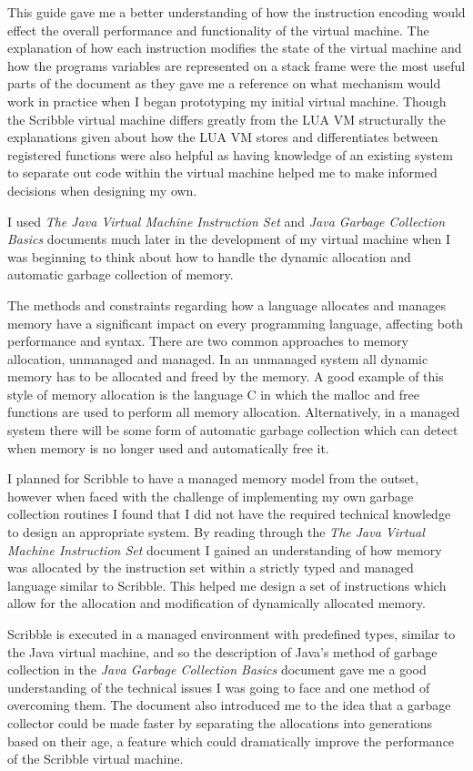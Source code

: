 \documentclass[]{final_report}
\begin{document}
This guide gave me a better understanding of how the instruction encoding would effect the overall performance and functionality of the virtual machine. The explanation of how each instruction modifies the state of the virtual machine and how the programs variables are represented on a stack frame were the most useful parts of the document as they gave me a reference on what mechanism would work in practice when I began prototyping my initial virtual machine. Though the Scribble virtual machine differs greatly from the LUA VM structurally the explanations given about how the LUA VM stores and differentiates between registered functions were also helpful as having knowledge of an existing system to separate out code within the virtual machine helped me to make informed decisions when designing my own.

I used \emph{The Java Virtual Machine Instruction Set}\cite{JVMBYTECODE} and \emph{Java Garbage Collection Basics}\cite{JVMGC} documents  much later in the development of my virtual machine when I was beginning to think about how to handle the dynamic allocation and automatic garbage collection of memory. 

The methods and constraints regarding how a language allocates and manages memory have a significant impact on every programming language, affecting both performance and syntax. There are two common approaches to memory allocation, unmanaged and managed. In an unmanaged system all dynamic memory has to be allocated and freed by the memory. A good example of this style of memory allocation is the language C in which the malloc and free functions are used to perform all memory allocation. Alternatively, in a managed system there will be some form of automatic garbage collection which can detect when memory is no longer used and automatically free it. 

I planned for Scribble to have a managed memory model from the outset, however when faced with the challenge of implementing my own garbage collection routines I found that I did not have the required technical knowledge to design an appropriate system. By reading through the \emph{The Java Virtual Machine Instruction Set}\cite{JVMBYTECODE} document I gained an understanding of how memory was allocated by the instruction set within a strictly typed and managed language similar to Scribble. This helped me design a set of instructions which allow for the allocation and modification of dynamically allocated memory.

Scribble is executed in a managed environment with predefined types, similar to the Java virtual machine, and so the description of Java's method of garbage collection in the \emph{Java Garbage Collection Basics}\cite{JVMGC} document gave me a good understanding of the technical issues I was going to face and one method of overcoming them. The document also introduced me to the idea that a garbage collector could be made faster by separating the allocations into generations based on their age, a feature which could dramatically improve the performance of the Scribble virtual machine. 
\end{document}
